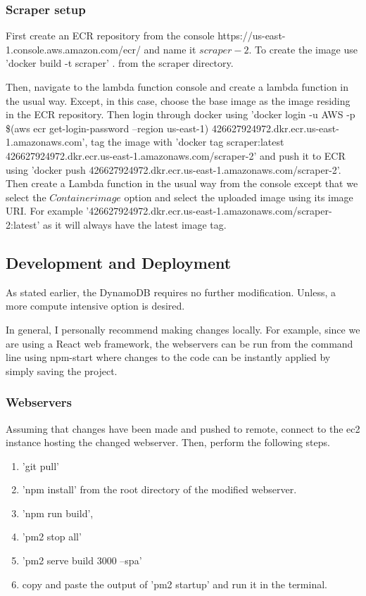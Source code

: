 \documentclass[12pt]{article}
\begin{document}
\subsubsection{Scraper setup}

First create an ECR repository from the console https://us-east-1.console.aws.amazon.com/ecr/ and name it $scraper-2$. To create the image use 'docker build -t scraper' . from the scraper directory. 

Then, navigate to the lambda function console and create a lambda function in the usual way. Except, in this case, choose the base image as the image residing in the ECR repository. Then login through docker using 
'docker login -u AWS -p \$(aws ecr get-login-password --region us-east-1) 426627924972.dkr.ecr.us-east-1.amazonaws.com', 
tag the image with 
'docker tag scraper:latest 426627924972.dkr.ecr.us-east-1.amazonaws.com/scraper-2' and push it to ECR using 
'docker push 426627924972.dkr.ecr.us-east-1.amazonaws.com/scraper-2'. 
Then create a Lambda function in the usual way from the console except that we select the $Container image$ option and select the uploaded image using its image URI. For example '426627924972.dkr.ecr.us-east-1.amazonaws.com/scraper-2:latest' as it will always have the latest image tag.

\subsection{Development and Deployment}

As stated earlier, the DynamoDB requires no further modification. Unless, a more compute intensive option is desired.

In general, I personally recommend making changes locally. For example, since we are using a React web framework, the webservers can be run from the command line using npm-start where changes to the code can be instantly applied by simply saving the project. 

\subsubsection{Webservers}

Assuming that changes have been made and pushed to remote, connect to the ec2 instance hosting the changed webserver. Then, perform the following steps.

\begin{enumerate}
    \item 'git pull'
    \item 'npm install' from the root directory of the modified webserver.
    \item 'npm run build',
    \item 'pm2 stop all'
    \item 'pm2 serve build 3000 --spa' 
    \item copy and paste the output of 'pm2 startup' and run it in the terminal.
\end{enumerate}
\end{document}
